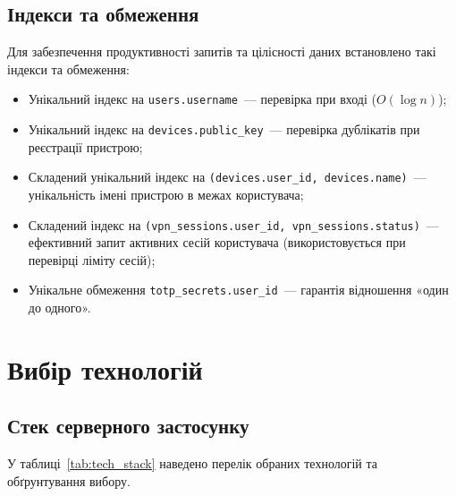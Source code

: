 \subsection{Індекси та обмеження}

Для забезпечення продуктивності запитів та цілісності даних
встановлено такі індекси та обмеження:

\begin{itemize}
  \item Унікальний індекс на \texttt{users.username}~---
    перевірка при вході (\(O(\log n)\));
  \item Унікальний індекс на \texttt{devices.public\_key}~---
    перевірка дублікатів при реєстрації пристрою;
  \item Складений унікальний індекс на \texttt{(devices.user\_id,
    devices.name)}~--- унікальність імені пристрою в межах користувача;
  \item Складений індекс на \texttt{(vpn\_sessions.user\_id,
    vpn\_sessions.status)}~--- ефективний запит активних сесій
    користувача (використовується при перевірці ліміту сесій);
  \item Унікальне обмеження \texttt{totp\_secrets.user\_id}~---
    гарантія відношення «один до одного».
\end{itemize}

\section{Вибір технологій}
\label{sec:tech_stack}

\subsection{Стек серверного застосунку}

У таблиці~\ref{tab:tech_stack} наведено перелік обраних технологій
та обґрунтування вибору.

